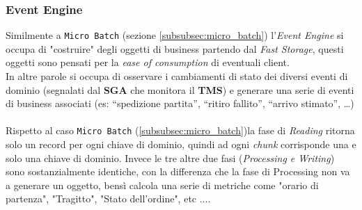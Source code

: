 \subsubsection{Event Engine}
\label{subsubsec:event_engine}
Similmente a \texttt{Micro Batch} (sezione \ref{subsubsec:micro_batch}) l'\textit{Event Engine} si occupa di "costruire" degli oggetti di business partendo dal \textit{Fast Storage}, questi oggetti sono pensati per la \textit{ease of consumption} di eventuali client.\\
In altre parole si occupa di osservare i cambiamenti di stato dei diversi eventi di dominio (segnalati dal \textbf{SGA} che monitora il \textbf{TMS}) e generare una serie di eventi di business associati (es: 
“spedizione partita”, “ritiro fallito”, “arrivo stimato”, …)\\\\
Rispetto al caso \texttt{Micro Batch} (\ref{subsubsec:micro_batch})la fase di \textit{Reading} ritorna solo un record per ogni chiave di dominio,
quindi ad ogni \textit{chunk} corrisponde una e solo una chiave di dominio.
Invece le tre altre due fasi (\textit{Processing e Writing}) sono sostanzialmente identiche, con la differenza che la fase di Processing non va a generare un oggetto, bensì calcola una serie di metriche come "orario di partenza", "Tragitto", "Stato dell'ordine", etc ....